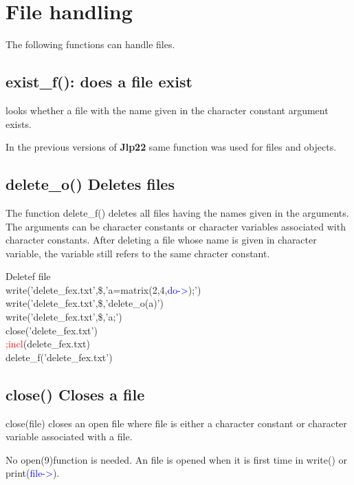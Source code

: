\section{File handling}
\label{file}
The following functions can handle files.
\subsection{\textcolor{VioletRed}{exist\_f}(): does a file exist}
\label{existf}
looks whether a file with the name given in
the character constant  argument exists.
\begin{note}
In the previous versions of \textbf{Jlp22} same function was used for files and objects.
\end{note}
\subsection{\textcolor{VioletRed}{delete\_o}() Deletes files}
\label{delete_f}
The function \textcolor{VioletRed}{delete\_f}() deletes all files having the names given in the arguments.
The arguments can be character constants or character variables associated with character
constants. After deleting a file whose name is given in character variable, the variable still refers to the same
chracter constant.
\begin{example}[deletfex]Deletef file\\
\label{deletfex}
\textcolor{VioletRed}{write}('delete\_fex.txt',\$,'a=\textcolor{VioletRed}{matrix}(2,4,\textcolor{blue}{do->});')\\
\textcolor{VioletRed}{write}('delete\_fex.txt',\$,'\textcolor{VioletRed}{delete\_o}(a)')\\
\textcolor{VioletRed}{write}('delete\_fex.txt',\$,'a;')\\
\textcolor{VioletRed}{close}('delete\_fex.txt')\\
\textcolor{Red}{;incl}(delete\_fex.txt)\\
\textcolor{VioletRed}{delete\_f}('delete\_fex.txt')
\end{example}
\subsection{\textcolor{VioletRed}{close}() Closes a file}
\label{close}
\textcolor{VioletRed}{close}(file) closes an open file where file is either a character constant
or character variable associated with a file.
\begin{note}
No open(9)function is needed. An file is opened when it is first time in \textcolor{VioletRed}{write}() or
\textcolor{VioletRed}{print}(\textcolor{blue}{file->}).
\end{note}
